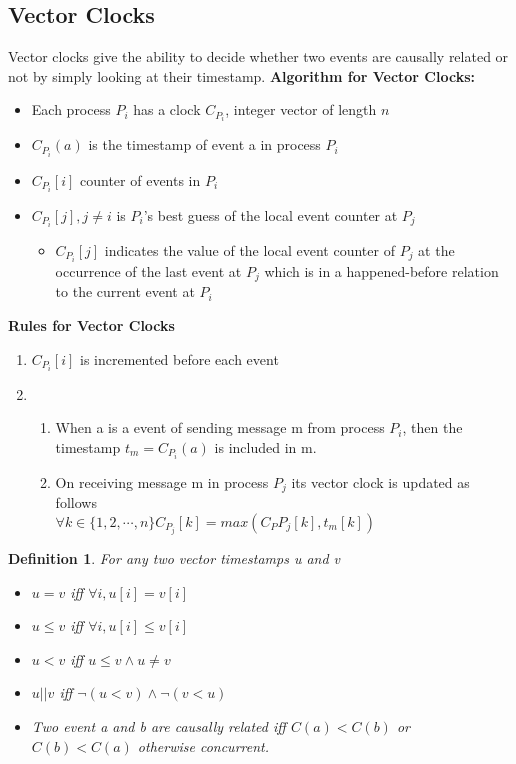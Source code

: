 \documentclass[a4paper]{article}
\newtheorem{definition}{Definition}
\begin{document}
\subsection{Vector Clocks}
Vector clocks give the ability to decide whether two events are causally related
or not by simply looking at their timestamp.
\textbf{Algorithm for Vector Clocks:}
\begin{itemize}
	\item Each process $P_i$ has a clock $C_{P_i}$, integer vector of length
		$n$
	\item $C_{P_i}(a)$ is the timestamp of event a in process $P_i$
	\item $C_{P_i}[i]$ counter of events in $P_i$
	\item $C_{P_i}[j], j\neq i$ is $P_i$'s best guess of the local event
		counter at $P_j$
		\begin{itemize}
			\item $C_{P_i}[j]$ indicates the value of the local
				event counter of $P_j$ at the occurrence of the
				last event at $P_j$ which is in a
				happened-before relation to the current event at
				$P_i$
		\end{itemize}
\end{itemize}
\textbf{Rules for Vector Clocks}
\begin{enumerate}
	\item $C_{P_i}[i]$ is incremented before each event
	\item \begin{enumerate}
			\item When a is a event of sending message m from
				process $P_i$, then the timestamp
				$t_m=C_{P_i}(a)$ is included in m.
			\item On receiving message m in process $P_j$  its
				vector clock is updated as follows\\
				$\forall k \in \{1,2,\cdots,n\} C_{P_j}[k] =
				max(C_P{P_j}[k],t_m[k])$
		\end{enumerate}
\end{enumerate}
\begin{definition}
	For any two vector timestamps u and v
	\begin{itemize}
		\item $u=v$ iff $\forall i, u[i]=v[i]$
		\item $u\leq v$ iff $\forall i, u[i]\leq v[i]$
		\item $u < v$ iff $u \leq v \land u\neq v$
		\item $u||v$ iff $\lnot(u<v) \land \lnot(v<u)$
		\item Two event a and b are causally related iff $C(a)<C(b)$ or
			$C(b) < C(a)$ otherwise concurrent.
	\end{itemize}
\end{definition}
\end{document}
